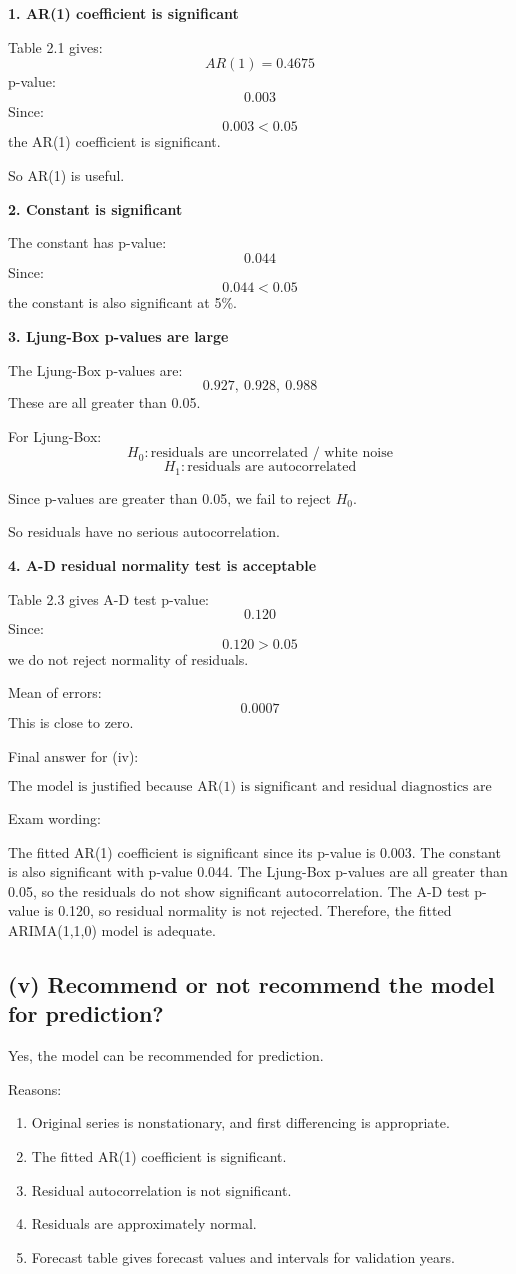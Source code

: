 \documentclass[11pt]{article}
\begin{document}
\textbf{1. AR(1) coefficient is significant}

Table 2.1 gives:
\[
AR(1)=0.4675
\]
p-value:
\[
0.003
\]
Since:
\[
0.003<0.05
\]
the AR(1) coefficient is significant.

So AR(1) is useful.

\textbf{2. Constant is significant}

The constant has p-value:
\[
0.044
\]
Since:
\[
0.044<0.05
\]
the constant is also significant at 5\%.

\textbf{3. Ljung-Box p-values are large}

The Ljung-Box p-values are:
\[
0.927,\ 0.928,\ 0.988
\]
These are all greater than 0.05.

For Ljung-Box:
\[
H_0: \text{residuals are uncorrelated / white noise}
\]
\[
H_1: \text{residuals are autocorrelated}
\]

Since p-values are greater than 0.05, we fail to reject $H_0$.

So residuals have no serious autocorrelation.

\textbf{4. A-D residual normality test is acceptable}

Table 2.3 gives A-D test p-value:
\[
0.120
\]
Since:
\[
0.120>0.05
\]
we do not reject normality of residuals.

Mean of errors:
\[
0.0007
\]
This is close to zero.

Final answer for (iv):

\[
\boxed{\text{The model is justified because AR(1) is significant and residual diagnostics are acceptable.}}
\]

Exam wording:

The fitted AR(1) coefficient is significant since its p-value is 0.003. The constant is also significant with p-value 0.044. The Ljung-Box p-values are all greater than 0.05, so the residuals do not show significant autocorrelation. The A-D test p-value is 0.120, so residual normality is not rejected. Therefore, the fitted ARIMA(1,1,0) model is adequate.

\subsection*{(v) Recommend or not recommend the model for prediction?}
Yes, the model can be recommended for prediction.

Reasons:
\begin{enumerate}
  \item Original series is nonstationary, and first differencing is appropriate.
  \item The fitted AR(1) coefficient is significant.
  \item Residual autocorrelation is not significant.
  \item Residuals are approximately normal.
  \item Forecast table gives forecast values and intervals for validation years.
\end{enumerate}
\end{document}
